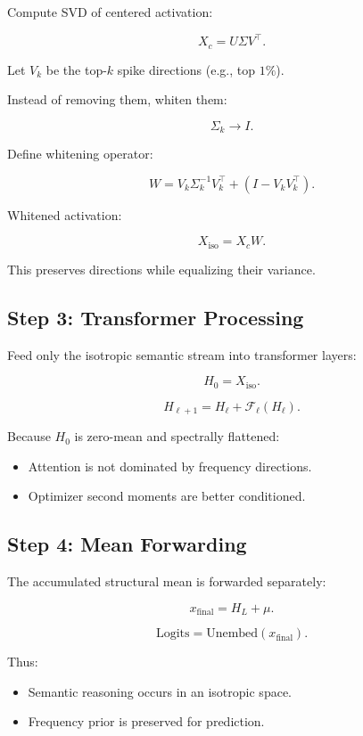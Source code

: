 \documentclass[11pt]{article}
\begin{document}
Compute SVD of centered activation:

\[
X_c = U \Sigma V^\top.
\]

Let $V_k$ be the top-$k$ spike directions (e.g., top $1\%$).

Instead of removing them, whiten them:

\[
\Sigma_k \rightarrow I.
\]

Define whitening operator:

\[
W = V_k \Sigma_k^{-1} V_k^\top + (I - V_k V_k^\top).
\]

Whitened activation:

\[
X_{\text{iso}} = X_c W.
\]

This preserves directions while equalizing their variance.

\subsection{Step 3: Transformer Processing}

Feed only the isotropic semantic stream into transformer layers:

\[
H_0 = X_{\text{iso}}.
\]

\[
H_{\ell+1} = H_\ell + \mathcal{F}_\ell(H_\ell).
\]

Because $H_0$ is zero-mean and spectrally flattened:

\begin{itemize}
    \item Attention is not dominated by frequency directions.
    \item Optimizer second moments are better conditioned.
\end{itemize}

\subsection{Step 4: Mean Forwarding}

The accumulated structural mean is forwarded separately:

\[
x_{\text{final}} = H_L + \mu.
\]

\[
\text{Logits} = \text{Unembed}(x_{\text{final}}).
\]

Thus:

\begin{itemize}
    \item Semantic reasoning occurs in an isotropic space.
    \item Frequency prior is preserved for prediction.
\end{itemize}
\end{document}
